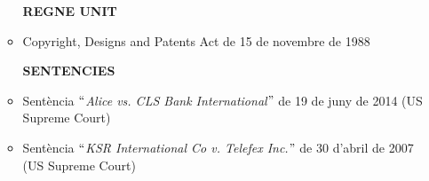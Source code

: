 \documentclass[12pt]{article}
\renewcommand{\_}{\kern-1.5pt\textunderscore\kern-1.5pt}
\begin{document}
\begin{itemize}
\begin{itemize}
\vspace{\baselineskip}
\textbf{REGNE UNIT}\par


\vspace{\baselineskip}
	\item Copyright, Designs and Patents Act de 15 de novembre de 1988\par


\vspace{\baselineskip}

\vspace{\baselineskip}

\vspace{\baselineskip}

\vspace{\baselineskip}
\begin{Center}
{\fontsize{16pt}{19.2pt}\selectfont \textbf{SENTENCIES}\par}
\end{Center}\par


\vspace{\baselineskip}

\vspace{\baselineskip}
	\item Sentència \textit{$``$Alice vs. CLS Bank International$"$  }de 19 de juny de 2014 (US Supreme Court)\par


\vspace{\baselineskip}
	\item Sentència\textit{ $``$KSR International Co v. Telefex Inc.$"$  }de 30 d’abril de 2007 (US Supreme Court)
\end{itemize}\par


\vspace{\baselineskip}

\end{itemize}
\printbibliography
\end{document}
